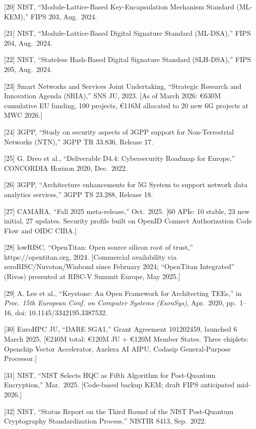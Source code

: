 \documentclass{ieeeaccess}
\begin{document}
{[}20{]} NIST, ``Module-Lattice-Based Key-Encapsulation Mechanism
Standard (ML-KEM),'' FIPS 203, Aug.~2024.

{[}21{]} NIST, ``Module-Lattice-Based Digital Signature Standard
(ML-DSA),'' FIPS 204, Aug.~2024.

{[}22{]} NIST, ``Stateless Hash-Based Digital Signature Standard
(SLH-DSA),'' FIPS 205, Aug.~2024.

{[}23{]} Smart Networks and Services Joint Undertaking, ``Strategic
Research and Innovation Agenda (SRIA),'' SNS JU, 2023. {[}As of March
2026: €630M cumulative EU funding, 100 projects, €116M allocated to 20
new 6G projects at MWC 2026.{]}

{[}24{]} 3GPP, ``Study on security aspects of 3GPP support for
Non-Terrestrial Networks (NTN),'' 3GPP TR 33.836, Release 17.

{[}25{]} G. Dreo et al., ``Deliverable D4.4: Cybersecurity Roadmap for
Europe,'' CONCORDIA Horizon 2020, Dec.~2022.

{[}26{]} 3GPP, ``Architecture enhancements for 5G System to support
network data analytics services,'' 3GPP TS 23.288, Release 18.

{[}27{]} CAMARA, ``Fall 2025 meta-release,'' Oct.~2025. {[}60 APIs: 10
stable, 23 new initial, 27 updates. Security profile built on OpenID
Connect Authorization Code Flow and OIDC CIBA.{]}

{[}28{]} lowRISC, ``OpenTitan: Open source silicon root of trust,''
https://opentitan.org, 2024. {[}Commercial availability via
zeroRISC/Nuvoton/Winbond since February 2024; ``OpenTitan Integrated''
(Rivos) presented at RISC-V Summit Europe, May 2025.{]}

{[}29{]} A. Lee et al., ``Keystone: An Open Framework for Architecting
TEEs,'' in \emph{Proc. 15th European Conf. on Computer Systems
(EuroSys)}, Apr.~2020, pp.~1--16, doi: 10.1145/3342195.3387532.

{[}30{]} EuroHPC JU, ``DARE SGA1,'' Grant Agreement 101202459, launched
6 March 2025. {[}€240M total: €120M JU + €120M Member States. Three
chiplets: Openchip Vector Accelerator, Axelera AI AIPU, Codasip
General-Purpose Processor.{]}

{[}31{]} NIST, ``NIST Selects HQC as Fifth Algorithm for Post-Quantum
Encryption,'' Mar.~2025. {[}Code-based backup KEM; draft FIPS
anticipated mid-2026.{]}

{[}32{]} NIST, ``Status Report on the Third Round of the NIST
Post-Quantum Cryptography Standardization Process,'' NISTIR 8413,
Sep.~2022.
\end{document}
